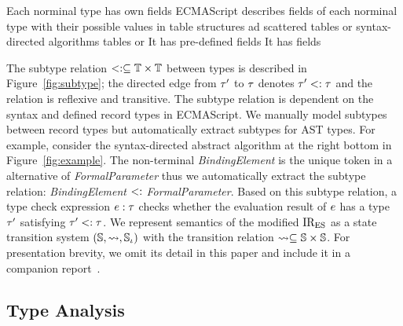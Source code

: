 Each norminal type has own fields 
ECMAScript describes fields of each norminal type with their possible values in
table structures ad
scattered tables or syntax-directed algorithms
tables or 
It has pre-defined fields
It has fields

The subtype relation $<: \subseteq \mathbb{T} \times \mathbb{T}$ between types is
described in Figure~\ref{fig:subtype}; the directed edge from $\tau'$ to $\tau$
denotes $\tau' <: \tau$ and the relation is reflexive and transitive.  The
subtype relation is dependent on the syntax and defined record types in
ECMAScript.  We manually model subtypes between record types but automatically
extract subtypes for AST types.  For example, consider the syntax-directed
abstract algorithm at the right bottom in Figure~\ref{fig:example}.  The
non-terminal \textit{BindingElement} is the unique token in a alternative of
\textit{FormalParameter} thus we automatically extract the subtype relation:
\textit{BindingElement} $<:$ \textit{FormalParameter}.  Based on this
subtype relation, a type check expression $e: \tau$ checks whether the
evaluation result of $e$ has a type $\tau'$ satisfying $\tau' <: \tau$.
We represent semantics of the modified ${\text{IR}_\text{ES}}$ as a state transition system
$(\mathbb{S}, \leadsto, {\mathbb{S}}_\iota)$ with the transition relation $\leadsto \subseteq
\mathbb{S} \times \mathbb{S}$.  For presentation brevity, we omit its detail in this
paper and include it in a companion report~.
% 
% 
% 


\subsection{Type Analysis}\label{sec:analysis}

